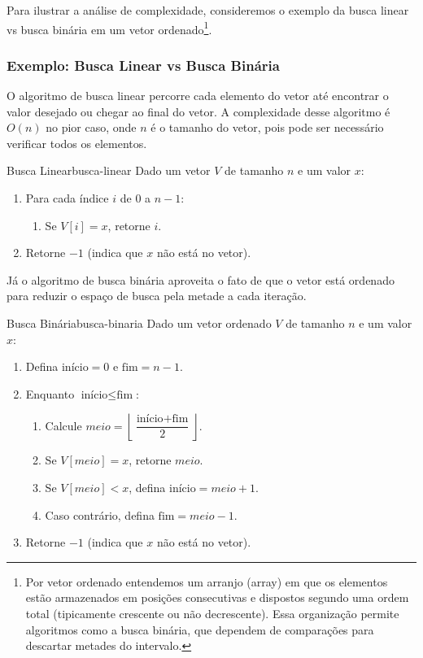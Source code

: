 Para ilustrar a análise de complexidade, consideremos o exemplo da busca linear vs busca binária em um vetor ordenado\footnote{Por vetor ordenado entendemos um arranjo (array) em que os elementos estão armazenados em posições consecutivas e dispostos segundo uma ordem total (tipicamente crescente ou não decrescente). Essa organização permite algoritmos como a busca binária, que dependem de comparações para descartar metades do intervalo.}.

\subsubsection{Exemplo: Busca Linear vs Busca Binária}

O algoritmo de busca linear percorre cada elemento do vetor até encontrar o valor desejado ou chegar ao final do vetor. A complexidade desse algoritmo é \(O(n)\) no pior caso, onde \(n\) é o tamanho do vetor, pois pode ser necessário verificar todos os elementos.

\begin{algobox}{Busca Linear}{busca-linear}
	Dado um vetor \(V\) de tamanho \(n\) e um valor \(x\):
	\begin{enumerate}\setlength{\itemsep}{2pt}
		\item Para cada índice \(i\) de \(0\) a \(n - 1\):
		      \begin{enumerate}\setlength{\itemsep}{2pt}
			      \item Se \(V[i] = x\), retorne \(i\).
		      \end{enumerate}
		\item Retorne \(-1\) (indica que \(x\) não está no vetor).
	\end{enumerate}
\end{algobox}


Já o algoritmo de busca binária aproveita o fato de que o vetor está ordenado para reduzir o espaço de busca pela metade a cada iteração.

\begin{algobox}{Busca Binária}{busca-binaria}
	Dado um vetor ordenado \(V\) de tamanho \(n\) e um valor \(x\):
	\begin{enumerate}\setlength{\itemsep}{2pt}
		\item Defina \(\text{início} = 0\) e \(\text{fim} = n - 1\).
		\item Enquanto \(\text{início} \leq \text{fim}\):
		      \begin{enumerate}\setlength{\itemsep}{2pt}
			      \item Calcule \(meio = \left\lfloor \dfrac{\text{início} + \text{fim}}{2} \right\rfloor\).
			      \item Se \(V[meio] = x\), retorne \(meio\).
			      \item Se \(V[meio] < x\), defina \(\text{início} = meio + 1\).
			      \item Caso contrário, defina \(\text{fim} = meio - 1\).
		      \end{enumerate}
		\item Retorne \(-1\) (indica que \(x\) não está no vetor).
	\end{enumerate}
\end{algobox}

